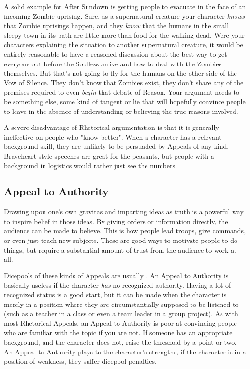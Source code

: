 A solid example for After Sundown is getting people to evacuate in the face of an incoming Zombie uprising. Sure, as a supernatural creature your character \textit{knows} that Zombie uprisings happen, and they \textit{know} that the humans in the small sleepy town in its path are little more than food for the walking dead. Were your characters explaining the situation to another supernatural creature, it would be entirely reasonable to have a reasoned discussion about the best way to get everyone out before the Soulless arrive and how to deal with the Zombies themselves. But that's not going to fly for the humans on the other side of the Vow of Silence. They don't know that Zombies exist, they don't share any of the premises required to even \textit{begin} that debate of Reason. Your argument needs to be something else, some kind of tangent or lie that will hopefully convince people to leave in the absence of understanding or believing the true reasons involved.

A severe disadvantage of Rhetorical argumentation is that it is generally ineffective on people who "know better". When a character has a relevant background skill, they are unlikely to be persuaded by Appeals of any kind. Braveheart style speeches are great for the peasants, but people with a background in logistics would rather just see the numbers.

\subsection{Appeal to Authority}

Drawing upon one's own gravitas and imparting ideas as truth is a powerful way to inspire belief in those ideas. By giving orders or information directly, the audience can be made to believe. This is how people lead troops, give commands, or even just teach new subjects. These are good ways to motivate people to do things, but require a substantial amount of trust from the audience to work at all.

Dicepools of these kinds of Appeals are usually . An Appeal to Authority is basically useless if the character \textit{has} no recognized authority. Having a lot of recognized status is a good start, but it can be made when the character is merely in a position where they are circumstantially supposed to be listened to (such as a teacher in a class or even a team leader in a group project). As with most Rhetorical Appeals, an Appeal to Authority is poor at convincing people who are familiar with the topic if you are not. If someone has an appropriate background, and the character does not, raise the threshold by a point or two. An Appeal to Authority plays to the character's strengths, if the character is in a position of weakness, they suffer dicepool penalties.

